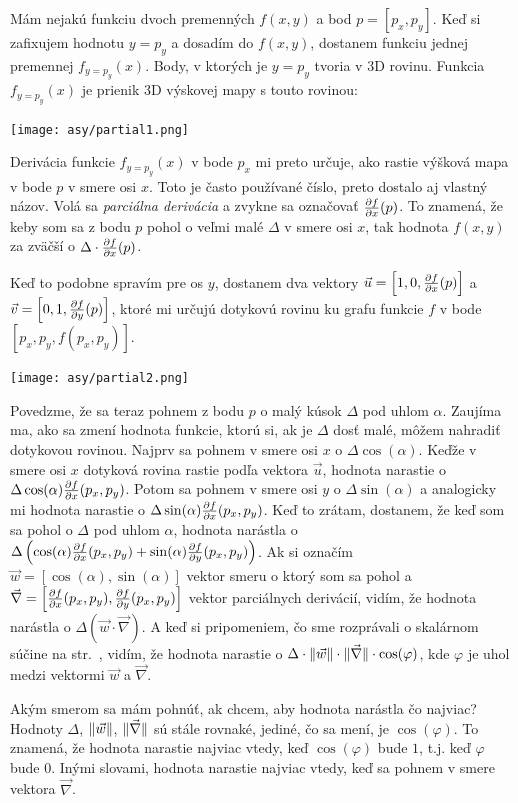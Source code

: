 Mám nejakú funkciu dvoch premenných $f(x,y)$ a bod $p=[p_x,p_y]$.
Keď si zafixujem hodnotu $y=p_y$ a dosadím do $f(x,y)$,
dostanem funkciu jednej premennej $f_{y=p_y}(x)$. Body, v ktorých je $y=p_y$ tvoria v 3D rovinu.
Funkcia $f_{y=p_y}(x)$ je prienik 3D výskovej mapy s touto rovinou:

\centerline{\texttt{[image: asy/partial1.png]}}

Derivácia funkcie $f_{y=p_y}(x)$ v bode $p_x$ mi preto určuje, ako rastie výšková mapa
v bode $p$ v smere osi $x$. Toto je často používané číslo, preto  dostalo aj vlastný názov. 
Volá sa {\em parciálna derivácia} a zvykne sa označovať $\pdv{f}{x}(p)$.
To znamená, že keby som sa z bodu $p$ pohol o  veľmi malé $\Delta$ v smere 
osi $x$, tak hodnota $f(x,y)$ za zväčší o $\Delta\cdot\pdv{f}{x}(p)$.

Keď to podobne spravím pre os $y$, dostanem dva vektory $\vec{u}=\left[1,0,\pdv{f}{x}(p)\right]$ a  $\vec{v}=\left[0,1,\pdv{f}{y}(p)\right]$, ktoré mi určujú dotykovú rovinu
ku grafu funkcie $f$ v bode $\left[p_x,p_y,f(p_x,p_y)\right]$.

\centerline{\texttt{[image: asy/partial2.png]}}

Povedzme, že sa teraz pohnem z bodu $p$ o malý kúsok $\Delta$ pod uhlom $\alpha$. Zaujíma ma, ako sa zmení hodnota funkcie, ktorú si, ak je  $\Delta$ dosť malé, môžem nahradiť
dotykovou rovinou. Najprv sa pohnem v smere osi $x$ o $\Delta\cos(\alpha)$. Keďže v smere osi $x$ dotyková rovina rastie podľa vektora $\vec{u}$, 
hodnota narastie o $\Delta\cos(\alpha)\pdv{f}{x}(p_x,p_y)$. Potom sa pohnem v smere osi $y$ o $\Delta\sin(\alpha)$ a analogicky mi hodnota narastie o
$\Delta\sin(\alpha)\pdv{f}{x}(p_x,p_y)$. Keď to zrátam, dostanem, že keď som sa pohol o $\Delta$ pod uhlom $\alpha$, hodnota 
narástla o $\Delta\left(\cos(\alpha)\pdv{f}{x}(p_x,p_y)+\sin(\alpha)\pdv{f}{y}(p_x,p_y)\right)$.
Ak si označím $\vec{w}=\left[\cos(\alpha),\sin(\alpha)\right]$ vektor smeru o ktorý som sa pohol 
a $\vec\nabla=\left[\pdv{f}{x}(p_x,p_y),\pdv{f}{y}(p_x,p_y)\right]$ vektor parciálnych derivácií, vidím, že hodnota narástla o $\Delta(\vec{w}\cdot\vec{\nabla})$. A keď si pripomeniem,
čo sme rozprávali o skalárnom súčine na str.~\pageref{page:dotproduct-angle}, vidím, že hodnota narastie o
$\Delta\cdot\Vert{\vec{w}}\Vert\cdot\Vert{\vec{\nabla}}\Vert\cdot\cos(\varphi)$, kde $\varphi$ je uhol medzi vektormi $\vec{w}$ a $\vec{\nabla}$.

Akým smerom sa mám pohnúť, ak chcem, aby hodnota narástla čo najviac? Hodnoty $\Delta$, $\Vert{\vec{w}}\Vert$, $\Vert{\vec{\nabla}}\Vert$ sú stále rovnaké, jediné, čo sa mení, je
$\cos(\varphi)$. To znamená, že hodnota narastie najviac vtedy, keď $\cos(\varphi)$ bude $1$, t.j. keď $\varphi$ bude $0$. Inými slovami, hodnota narastie najviac
vtedy, keď sa pohnem v smere vektora $\vec{\nabla}$. 

